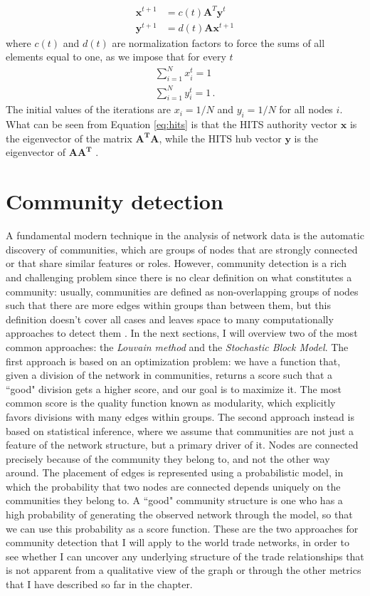 \begin{align}\label{eq:hits}
    \mathbf{x}^{t+1} &= c(t) \mathbf{A}^T \mathbf{y}^t \\
    \mathbf{y}^{t+1} &= d(t) \mathbf{A} \mathbf{x}^{t+1} 
\end{align}
where $c(t)$ and $d(t)$ are normalization factors to force the sums of all elements equal to one, as we impose that for every $t$
\begin{align*}
    \sum_{i=1}^N x_i^{t} = 1 \\
    \sum_{i=1}^N y_i^{t} = 1 \,.
\end{align*}
The initial values of the iterations are $x_i = 1/N$ and $y_i = 1/N$ for all nodes $i$. What can be seen from Equation \ref{eq:hits} is that the HITS authority vector $\mathbf{x}$ is the eigenvector of the matrix $\mathbf{A^T A}$, while the HITS hub vector $\mathbf{y}$ is the eigenvector of $\mathbf{A A^T}$ \cite{deguchi2014hubs}.

\section{Community detection}\label{sec:4community}
A fundamental modern technique in the analysis of network data is the automatic discovery of communities, which are groups of nodes that are strongly connected or that share similar features or roles. However, community detection is a rich and challenging problem since there is no clear definition on what constitutes a community: usually, communities are defined as non-overlapping groups of nodes such that there are more edges within groups than between them, but this definition doesn't cover all cases and leaves space to many computationally approaches to detect them \cite{fortunato202220years}. In the next sections, I will overview two of the most common approaches: the \textit{Louvain method} and the \textit{Stochastic Block Model}. 
The first approach is based on an optimization problem: we have a function that, given a division of the network in communities, returns a score such that a ``good" division gets a higher score, and our goal is to maximize it. The most common score is the quality function known as modularity, which explicitly favors divisions with many edges within groups.
The second approach instead is based on statistical inference, where we assume that communities are not just a feature of the network structure, but a primary driver of it. Nodes are connected precisely because of the community they belong to, and not the other way around. The placement of edges is represented using a probabilistic model, in which the probability that two nodes are connected depends uniquely on the communities they belong to. A ``good" community structure is one who has a high probability of generating the observed network through the model, so that we can use this probability as a score function.
These are the two approaches for community detection that I will apply to the world trade networks, in order to see whether I can uncover any underlying structure of the trade relationships that is not apparent from a qualitative view of the graph or through the other metrics that I have described so far in the chapter.

